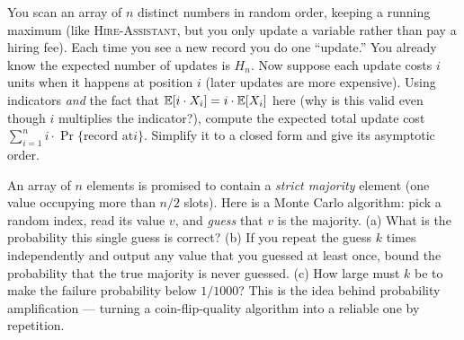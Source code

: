 \begin{exercise}
You scan an array of $n$ distinct numbers in random order, keeping a running
maximum (like \textsc{Hire-Assistant}, but you only update a variable rather than
pay a hiring fee). Each time you see a new record you do one ``update.'' You
already know the expected number of updates is $H_n$. Now suppose each update
costs $i$ units when it happens at position $i$ (later updates are more
expensive). Using indicators \emph{and} the fact that $\mathbb{E}[i \cdot X_i] = i \cdot
\mathbb{E}[X_i]$ here (why is this valid even though $i$ multiplies the indicator?),
compute the expected total update cost $\sum_{i=1}^n i \cdot \Pr\{\text{record at
} i\}$. Simplify it to a closed form and give its asymptotic order.
\end{exercise}

\begin{exercise}
An array of $n$ elements is promised to contain a \emph{strict majority} element
(one value occupying more than $n/2$ slots). Here is a Monte Carlo algorithm:
pick a random index, read its value $v$, and \emph{guess} that $v$ is the
majority. (a) What is the probability this single guess is correct? (b) If you
repeat the guess $k$ times independently and output any value that you guessed at
least once, bound the probability that the true majority is never guessed.
(c) How large must $k$ be to make the failure probability below $1/1000$? This is
the idea behind probability amplification --- turning a coin-flip-quality
algorithm into a reliable one by repetition.
\end{exercise}
